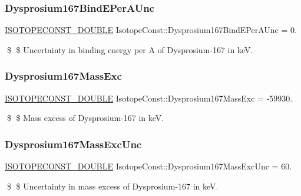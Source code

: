 \subsubsection{\texorpdfstring{Dysprosium167\+Bind\+E\+Per\+A\+Unc}{Dysprosium167BindEPerAUnc}}
{\footnotesize\ttfamily \mbox{\hyperlink{group___isotope_const-_macros_ga8f45a7272ce02c0b4c65c44636ed719a}{I\+S\+O\+T\+O\+P\+E\+C\+O\+N\+S\+T\+\_\+\+D\+O\+U\+B\+LE}} Isotope\+Const\+::\+Dysprosium167\+Bind\+E\+Per\+A\+Unc = 0.}

\$ \$ Uncertainty in binding energy per A of Dysprosium-\/167 in keV. \mbox{\label{group___isotope_const-_dysprosium-_dy167_ga20158a0c6136b6aa25a322255169553f}} 
\subsubsection{\texorpdfstring{Dysprosium167\+Mass\+Exc}{Dysprosium167MassExc}}
{\footnotesize\ttfamily \mbox{\hyperlink{group___isotope_const-_macros_ga8f45a7272ce02c0b4c65c44636ed719a}{I\+S\+O\+T\+O\+P\+E\+C\+O\+N\+S\+T\+\_\+\+D\+O\+U\+B\+LE}} Isotope\+Const\+::\+Dysprosium167\+Mass\+Exc = -\/59930.}

\$ \$ Mass excess of Dysprosium-\/167 in keV. \mbox{\label{group___isotope_const-_dysprosium-_dy167_ga1f59b7f2422e3214df0ef088a496af1a}} 
\subsubsection{\texorpdfstring{Dysprosium167\+Mass\+Exc\+Unc}{Dysprosium167MassExcUnc}}
{\footnotesize\ttfamily \mbox{\hyperlink{group___isotope_const-_macros_ga8f45a7272ce02c0b4c65c44636ed719a}{I\+S\+O\+T\+O\+P\+E\+C\+O\+N\+S\+T\+\_\+\+D\+O\+U\+B\+LE}} Isotope\+Const\+::\+Dysprosium167\+Mass\+Exc\+Unc = 60.}

\$ \$ Uncertainty in mass excess of Dysprosium-\/167 in keV. \mbox{\label{group___isotope_const-_dysprosium-_dy167_ga14071d223b92839bfb97bfe9a8a6c868}} 
